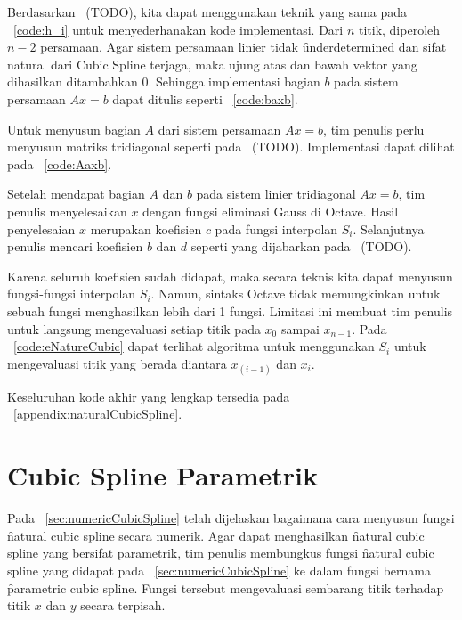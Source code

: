 Berdasarkan \equ~(TODO), kita dapat menggunakan teknik yang sama pada
\lst~\ref{code:h_i} untuk menyederhanakan kode implementasi. Dari $n$ titik,
diperoleh $n-2$ persamaan. Agar sistem persamaan linier tidak \f{underdetermined}
dan sifat natural dari \f{Cubic Spline} terjaga, maka ujung atas dan bawah vektor
yang dihasilkan ditambahkan $0$. Sehingga implementasi bagian $b$ pada sistem
persamaan $A x = b$ dapat ditulis seperti \lst~\ref{code:baxb}.



Untuk menyusun bagian $A$ dari sistem persamaan $A x = b$, tim penulis perlu
menyusun matriks tridiagonal seperti pada \equ~(TODO). Implementasi dapat
dilihat pada \lst~\ref{code:Aaxb}.



Setelah mendapat bagian $A$ dan $b$ pada sistem linier tridiagonal $A x = b$,
tim penulis menyelesaikan $x$ dengan fungsi eliminasi Gauss di Octave. Hasil
penyelesaian $x$ merupakan koefisien $c$ pada fungsi interpolan $S_i$.
Selanjutnya penulis mencari koefisien $b$ dan $d$ seperti yang dijabarkan
pada \equ~(TODO).

Karena seluruh koefisien sudah didapat, maka secara teknis kita dapat menyusun
fungsi-fungsi interpolan $S_i$. Namun, sintaks Octave tidak memungkinkan untuk
sebuah fungsi menghasilkan lebih dari 1 fungsi. Limitasi ini membuat tim
penulis untuk langsung mengevaluasi setiap titik pada $x_0$ sampai $x_{n-1}$.
Pada \lst~\ref{code:eNatureCubic} dapat terlihat algoritma untuk menggunakan
$S_i$ untuk mengevaluasi titik yang berada diantara $x_(i-1)$ dan $x_i$.



Keseluruhan kode akhir yang lengkap tersedia pada \apdx~\ref{appendix:naturalCubicSpline}.

\section{\f{Cubic Spline} Parametrik}
\label{sec:parametricSpline}
Pada \sect~\ref{sec:numericCubicSpline} telah dijelaskan bagaimana cara menyusun
fungsi \f{natural cubic spline} secara numerik. Agar dapat menghasilkan
\f{natural cubic spline} yang bersifat parametrik, tim penulis membungkus fungsi
\f{natural cubic spline} yang didapat pada \sect~\ref{sec:numericCubicSpline} ke
dalam fungsi bernama \f{parametric cubic spline}. Fungsi tersebut mengevaluasi
sembarang titik terhadap titik $x$ dan $y$ secara terpisah.

